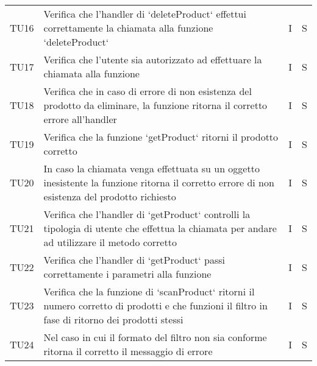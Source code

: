 \begin{center}
\begin{longtable}[!h]{p{45px} p{255px} p{35px} p{35px}}
        TU16          & Verifica che l'handler di `deleteProduct` effettui correttamente la chiamata alla funzione `deleteProduct`                                                                                       & I              & S              \\
        TU17          & Verifica che l'utente sia autorizzato ad effettuare la chiamata alla funzione                                                                                                                    & I              & S              \\
        TU18          & Verifica che in caso di errore di non esistenza del prodotto da eliminare, la funzione ritorna il corretto errore all'handler                                                                    & I              & S              \\
        TU19          & Verifica che la funzione `getProduct` ritorni il prodotto corretto                                                                                                                               & I              & S              \\
        TU20          & In caso la chiamata venga effettuata su un oggetto inesistente la funzione ritorna il corretto errore di non esistenza del prodotto richiesto                                                    & I              & S              \\                                                                                                                                                                                     
        TU21          & Verifica che l'handler di `getProduct` controlli la tipologia di utente che effettua la chiamata per andare ad utilizzare il metodo corretto                                                     & I              & S              \\
        TU22          & Verifica che l'handler di `getProduct` passi correttamente i parametri alla funzione                                                                                                             & I              & S              \\
        TU23          & Verifica che la funzione di `scanProduct` ritorni il numero corretto di prodotti e che funzioni il filtro in fase di ritorno dei prodotti stessi                                                 & I              & S              \\
        TU24          & Nel caso in cui il formato del filtro non sia conforme ritorna il corretto il messaggio di errore                                                                                                & I              & S              \\                                                                                                                                                                                   

\end{longtable}
\end{center}
